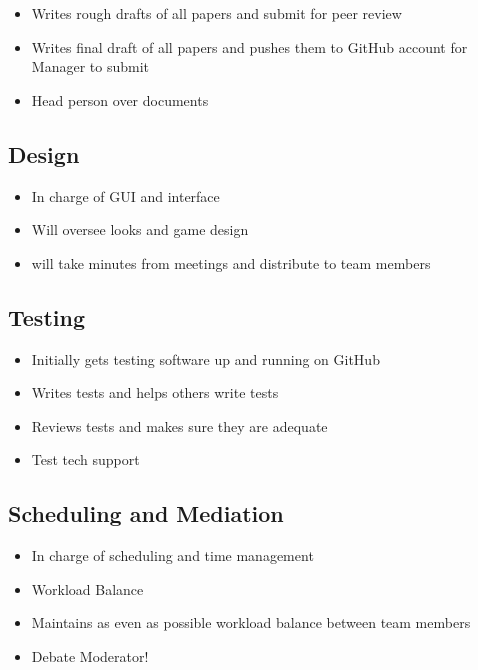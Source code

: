 \documentclass[11pt, titlepage]{article}
\begin{document}
    	\begin{itemize}
    		\item Writes rough drafts of all papers and submit for peer review
    		\item Writes final draft of all papers and pushes them to GitHub account 			 	for	Manager to submit
    		\item Head person over documents
    	\end{itemize}
   		
    \subsection{Design}

		\begin{itemize}
			\item In charge of GUI and interface
    		\item Will oversee looks and game design
    		\item will take minutes from meetings and distribute to team members
		\end{itemize}
    	
    \subsection{Testing}

		\begin{itemize}
			\item Initially gets testing software up and running on GitHub
  		  	\item Writes tests and helps others write tests
    		\item Reviews tests and makes sure they are adequate
    		\item Test tech support
		\end{itemize}
   
    \subsection{Scheduling and Mediation}
    
   		\begin{itemize}
    		\item In charge of scheduling and time management
    		\item Workload Balance
    		\item Maintains as even as possible workload balance between team members
    		\item Debate Moderator!
		\end{itemize}
             
\end{document}
